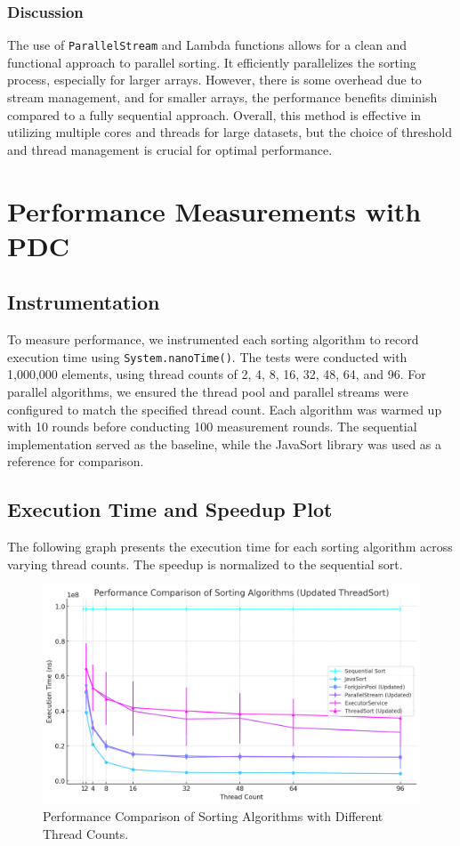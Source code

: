 \documentclass{article}
\begin{document}
\subsubsection{Discussion}
The use of \texttt{ParallelStream} and Lambda functions allows for a clean and functional approach to parallel sorting. It efficiently parallelizes the sorting process, especially for larger arrays. However, there is some overhead due to stream management, and for smaller arrays, the performance benefits diminish compared to a fully sequential approach. Overall, this method is effective in utilizing multiple cores and threads for large datasets, but the choice of threshold and thread management is crucial for optimal performance.


\newpage
\section{Performance Measurements with PDC}

\subsection{Instrumentation}
To measure performance, we instrumented each sorting algorithm to record execution time using \texttt{System.nanoTime()}. The tests were conducted with 1,000,000 elements, using thread counts of 2, 4, 8, 16, 32, 48, 64, and 96. For parallel algorithms, we ensured the thread pool and parallel streams were configured to match the specified thread count. Each algorithm was warmed up with 10 rounds before conducting 100 measurement rounds. The sequential implementation served as the baseline, while the JavaSort library was used as a reference for comparison.

\subsection{Execution Time and Speedup Plot}
The following graph presents the execution time for each sorting algorithm across varying thread counts. The speedup is normalized to the sequential sort. 

\begin{figure}[H]
    \centering
    \includegraphics[width=1.0\linewidth]{LaTex/images/Lab2.png}
    \caption{Performance Comparison of Sorting Algorithms with Different Thread Counts.}
    \label{fig:sorting-performance}
\end{figure}
\end{document}
